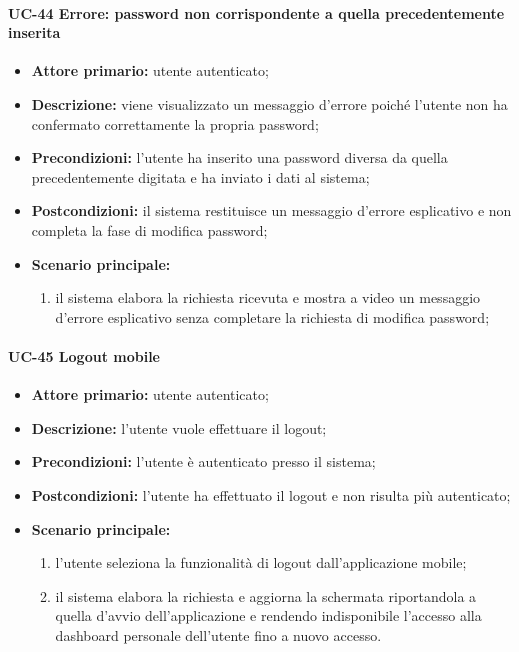 \paragraph{UC-44 Errore: password non corrispondente a quella precedentemente inserita}

	\begin{itemize}
		\item \textbf{Attore primario:} utente autenticato;

		\item \textbf{Descrizione:}  viene visualizzato un messaggio d'errore poiché l'utente non ha confermato correttamente la propria password;

		\item \textbf{Precondizioni:} l'utente ha inserito una password diversa da quella precedentemente digitata e ha inviato i dati al sistema;

		\item \textbf{Postcondizioni:} il sistema restituisce un messaggio d'errore esplicativo e non completa la fase di modifica password;

		\item \textbf{Scenario principale:}
	  		\begin{enumerate}
		  		\item il sistema elabora la richiesta ricevuta e mostra a video un messaggio d'errore esplicativo senza completare la richiesta di modifica password; 
	  		\end{enumerate}
	\end{itemize}

\paragraph{UC-45 Logout mobile}

	\begin{itemize}
		\item \textbf{Attore primario:} utente autenticato;

		\item \textbf{Descrizione:} l'utente vuole effettuare il logout;

		\item \textbf{Precondizioni:} l'utente è autenticato presso il sistema;

		\item \textbf{Postcondizioni:} l'utente ha effettuato il logout e non risulta più autenticato;

		\item \textbf{Scenario principale:}
	  		\begin{enumerate}
		  		\item l'utente seleziona la funzionalità di logout dall'applicazione mobile;
		  		\item il sistema elabora la richiesta e aggiorna la schermata riportandola a quella d'avvio dell'applicazione e rendendo indisponibile l'accesso alla dashboard personale dell'utente fino a nuovo accesso.
	  		\end{enumerate}
	\end{itemize}
